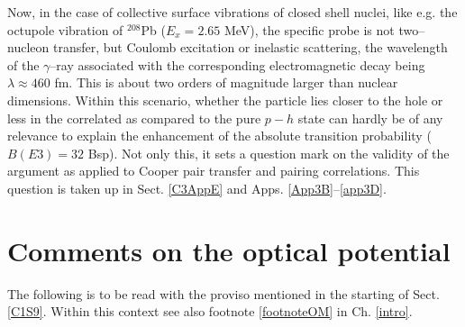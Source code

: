 Now, in the case of collective surface vibrations of closed shell nuclei, like e.g. the octupole vibration of $^{208}$Pb ($E_x=2.65$ MeV), the specific probe is not two--nucleon transfer, but Coulomb excitation or inelastic scattering,  the wavelength of the $\gamma$--ray associated with the corresponding electromagnetic decay being $\lambda\approx 460$ fm. This is about two orders of magnitude larger than nuclear dimensions. Within this scenario, whether  the particle lies closer to the hole or less in the correlated as compared to the pure $p-h$ state can hardly be of any relevance to explain  the enhancement of the absolute transition probability ($B(E3)=32$ Bsp). Not only this, it sets a question mark on the validity of the argument as applied to Cooper pair transfer and pairing correlations. This question is taken up in Sect.  
\ref{C3AppE} and Apps. \ref{App3B}--\ref{app3D}.







\section{Comments on the optical potential}\label{App2B}
The following is to be read with the proviso mentioned in the starting of Sect. \ref{C1S9}. Within this context see also footnote \ref{footnoteOM} in Ch. \ref{intro}.


